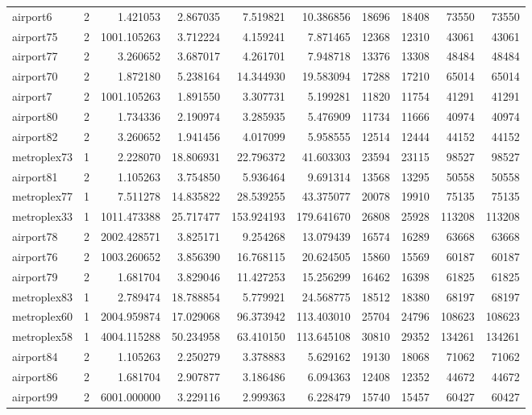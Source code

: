 \begin{longtable}{|l|r|r|r|r|r|r|r|r|r|}
airport6 & 2 & 1.421053 & 2.867035 & 7.519821 & 10.386856 & 18696 & 18408 & 73550 & 73550 \\
airport75 & 2 & 1001.105263 & 3.712224 & 4.159241 & 7.871465 & 12368 & 12310 & 43061 & 43061 \\
airport77 & 2 & 3.260652 & 3.687017 & 4.261701 & 7.948718 & 13376 & 13308 & 48484 & 48484 \\
airport70 & 2 & 1.872180 & 5.238164 & 14.344930 & 19.583094 & 17288 & 17210 & 65014 & 65014 \\
airport7 & 2 & 1001.105263 & 1.891550 & 3.307731 & 5.199281 & 11820 & 11754 & 41291 & 41291 \\
airport80 & 2 & 1.734336 & 2.190974 & 3.285935 & 5.476909 & 11734 & 11666 & 40974 & 40974 \\
airport82 & 2 & 3.260652 & 1.941456 & 4.017099 & 5.958555 & 12514 & 12444 & 44152 & 44152 \\
metroplex73 & 1 & 2.228070 & 18.806931 & 22.796372 & 41.603303 & 23594 & 23115 & 98527 & 98527 \\
airport81 & 2 & 1.105263 & 3.754850 & 5.936464 & 9.691314 & 13568 & 13295 & 50558 & 50558 \\
metroplex77 & 1 & 7.511278 & 14.835822 & 28.539255 & 43.375077 & 20078 & 19910 & 75135 & 75135 \\
metroplex33 & 1 & 1011.473388 & 25.717477 & 153.924193 & 179.641670 & 26808 & 25928 & 113208 & 113208 \\
airport78 & 2 & 2002.428571 & 3.825171 & 9.254268 & 13.079439 & 16574 & 16289 & 63668 & 63668 \\
airport76 & 2 & 1003.260652 & 3.856390 & 16.768115 & 20.624505 & 15860 & 15569 & 60187 & 60187 \\
airport79 & 2 & 1.681704 & 3.829046 & 11.427253 & 15.256299 & 16462 & 16398 & 61825 & 61825 \\
metroplex83 & 1 & 2.789474 & 18.788854 & 5.779921 & 24.568775 & 18512 & 18380 & 68197 & 68197 \\
metroplex60 & 1 & 2004.959874 & 17.029068 & 96.373942 & 113.403010 & 25704 & 24796 & 108623 & 108623 \\
metroplex58 & 1 & 4004.115288 & 50.234958 & 63.410150 & 113.645108 & 30810 & 29352 & 134261 & 134261 \\
airport84 & 2 & 1.105263 & 2.250279 & 3.378883 & 5.629162 & 19130 & 18068 & 71062 & 71062 \\
airport86 & 2 & 1.681704 & 2.907877 & 3.186486 & 6.094363 & 12408 & 12352 & 44672 & 44672 \\
airport99 & 2 & 6001.000000 & 3.229116 & 2.999363 & 6.228479 & 15740 & 15457 & 60427 & 60427 \\

\end{longtable}
